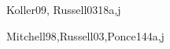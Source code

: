 \begin{syllabus}
\begin{unit}{\ISReasoningUnderUncertainty}{}{Koller09, Russell03}{18}{a,j}
\begin{topics}
    \item \ISReasoningUnderUncertaintyTopicReview
    \item \ISReasoningUnderUncertaintyTopicRandom
    \item \ISReasoningUnderUncertaintyTopicConditional
    \item \ISReasoningUnderUncertaintyTopicKnowledge
\end{topics}
\begin{learningoutcomes}
    \item \ISReasoningUnderUncertaintyLOApplyBayesDetermine [\Usage]
    \item \ISReasoningUnderUncertaintyLOExplainHowAssertions [\Usage]
    \item \ISReasoningUnderUncertaintyLOIdentifyExamplesRepresentations [\Usage]
    \item \ISReasoningUnderUncertaintyLOStateTheExact [\Usage]
\end{learningoutcomes}
\end{unit}

\begin{unit}{\ISBasicMachineLearning}{}{Mitchell98,Russell03,Ponce14}{4}{a,j}
\begin{topics}
    \item \ISBasicMachineLearningTopicDefinition
    \item \ISBasicMachineLearningTopicInductive
    \item \ISBasicMachineLearningTopicSimple
    \item \ISBasicMachineLearningTopicThe
    \item \ISBasicMachineLearningTopicMeasuring
\end{topics}
\begin{learningoutcomes}
    \item \ISBasicMachineLearningLOListThe [\Usage]
    \item \ISBasicMachineLearningLOIdentifyExamples [\Usage]
    \item \ISBasicMachineLearningLOExplainTheInductive [\Usage]
    \item \ISBasicMachineLearningLODescribeOver [\Usage]
    \item \ISBasicMachineLearningLOApplyTheLearning [\Usage]
\end{learningoutcomes}
\end{unit}


\end{syllabus}
